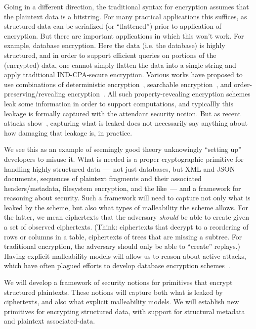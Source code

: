 Going in a different direction, the traditional syntax for encryption assumes that
the plaintext data is a bitstring.  For many practical applications this
suffices, as structured data can be serialized (or ``flattened'') prior to
application of encryption.  But there are important applications in which this
won't work.  For example, database encryption.  Here the data (i.e. the
database) is highly structured, and in order to support efficient queries on
portions of the (encrypted) data, one cannot simply flatten the data into a
single string and apply traditional IND-CPA-secure encryption.  Various works
have proposed to use combinations of deterministic
encryption~\cite{BBO07}, searchable
encryption~\cite{CJJ+13}, and order-preserving/revealing
encryption~\cite{KW16}. All such property-revealing encryption schemes leak some
information in order to support computations, and typicallly this leakage is
formally captured with the attendant security notion.  But as recent attacks
show~\cite{Cash15,NKW15,GSB+17}, capturing what is
leaked does not necessarily say anything about how damaging that leakage is, in
practice.

We see this as an example of seemingly good theory unknowingly
``setting up'' developers to misuse it.  What is needed is a proper
cryptographic primitive for handling highly structured data ---~not
just databases, but XML and JSON documents, sequences of plaintext
fragments and their associated headers/metadata, filesystem
encryption, and the like~--- and a framework for reasoning
about security.  Such a framework will need to capture not only what
is leaked by the scheme, but also what types of malleability the scheme
allows. For the latter, we mean ciphertexts that the
adversary \emph{should} be able to create given a set of observed
ciphertexts.  (Think: ciphertexts that decrypt to a reordering of rows
or columns in a table, ciphertexts of trees that are missing a
subtree.  For traditional encryption, the adversary should only be
able to ``create'' replays.)  Having explicit malleability models will allow us to
reason about active attacks, which have often plagued efforts to
develop database encryption schemes~\cite{GRS17}.

\begin{task}
We will develop a framework of security notions for primitives that
encrypt structured plaintexts.  These notions will capture both what
is leaked by ciphertexts, and also what explicit malleability models.
We will establish new primitives for encrypting structured data, with
support for structural metadata and plaintext associated-data.
\end{task}



